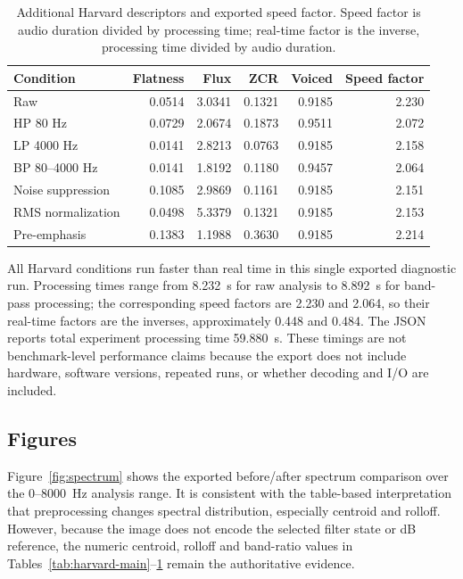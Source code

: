 \documentclass[11pt,a4paper]{article}
\begin{document}
\begin{table}[h]
\centering
\caption{Additional Harvard descriptors and exported speed factor. Speed factor is audio duration divided by processing time; real-time factor is the inverse, processing time divided by audio duration.}
\label{tab:harvard-extra}
\small
\begin{tabular}{lrrrrr}
\toprule
Condition & Flatness & Flux & ZCR & Voiced & Speed factor \\
\midrule
Raw & 0.0514 & 3.0341 & 0.1321 & 0.9185 & 2.230 \\
HP 80 Hz & 0.0729 & 2.0674 & 0.1873 & 0.9511 & 2.072 \\
LP 4000 Hz & 0.0141 & 2.8213 & 0.0763 & 0.9185 & 2.158 \\
BP 80--4000 Hz & 0.0141 & 1.8192 & 0.1180 & 0.9457 & 2.064 \\
Noise suppression & 0.1085 & 2.9869 & 0.1161 & 0.9185 & 2.151 \\
RMS normalization & 0.0498 & 5.3379 & 0.1321 & 0.9185 & 2.153 \\
Pre-emphasis & 0.1383 & 1.1988 & 0.3630 & 0.9185 & 2.214 \\
\bottomrule
\end{tabular}
\end{table}

All Harvard conditions run faster than real time in this single exported diagnostic run. Processing times range from \SI{8.232}{s} for raw analysis to \SI{8.892}{s} for band-pass processing; the corresponding speed factors are 2.230 and 2.064, so their real-time factors are the inverses, approximately 0.448 and 0.484. The JSON reports total experiment processing time \SI{59.880}{s}. These timings are not benchmark-level performance claims because the export does not include hardware, software versions, repeated runs, or whether decoding and I/O are included.

\subsection{Figures}

Figure~\ref{fig:spectrum} shows the exported before/after spectrum comparison over the 0--\SI{8000}{Hz} analysis range. It is consistent with the table-based interpretation that preprocessing changes spectral distribution, especially centroid and rolloff. However, because the image does not encode the selected filter state or dB reference, the numeric centroid, rolloff and band-ratio values in Tables~\ref{tab:harvard-main}--\ref{tab:harvard-extra} remain the authoritative evidence.
\end{document}
